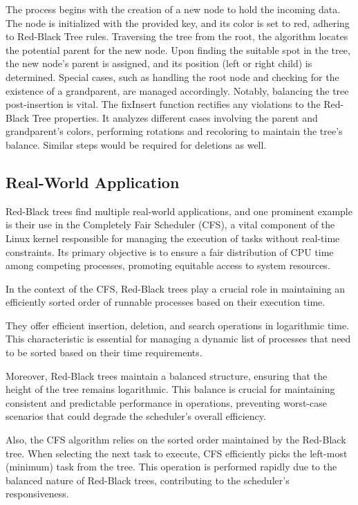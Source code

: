 \documentclass[12pt]{amsart}
\begin{document}
    The process begins with the creation of a new node to hold the incoming data. 
    The node is initialized with the provided key, and its color is set to red, 
    adhering to Red-Black Tree rules. Traversing the tree from the root, the 
    algorithm locates the potential parent for the new node. Upon finding the 
    suitable spot in the tree, the new node's parent is assigned, and its position 
    (left or right child) is determined. Special cases, such as handling the root 
    node and checking for the existence of a grandparent, are managed accordingly. 
    Notably, balancing the tree post-insertion is vital. The fixInsert function 
    rectifies any violations to the Red-Black Tree properties. It analyzes 
    different cases involving the parent and grandparent's colors, 
    performing rotations and recoloring to maintain the tree's balance.
    Similar steps would be required for deletions as well.

\subsection{Real-World Application}
   Red-Black trees find multiple real-world applications, and
   one prominent example is their use in the Completely Fair
   Scheduler (CFS), a vital component of the Linux kernel
   responsible for managing the execution of tasks without
   real-time constraints. Its primary objective is to ensure a
   fair distribution of CPU time among competing processes,
   promoting equitable access to system resources.
   
   In the context of the CFS, Red-Black trees play a crucial
   role in maintaining an efficiently sorted order of runnable
   processes based on their execution time.
   
   They offer efficient insertion, deletion, and search
   operations in logarithmic time. This characteristic is
   essential for managing a dynamic list of processes that need
   to be sorted based on their time requirements.
   
   Moreover, Red-Black trees maintain a balanced structure,
   ensuring that the height of the tree remains logarithmic.
   This balance is crucial for maintaining consistent and
   predictable performance in operations, preventing worst-case
   scenarios that could degrade the scheduler's overall
   efficiency.
   
   Also, the CFS algorithm relies on the sorted order maintained
   by the Red-Black tree. When selecting the next task to
   execute, CFS efficiently picks the left-most (minimum) task
   from the tree. This operation is performed rapidly due to the
   balanced nature of Red-Black trees, contributing to the
   scheduler's responsiveness.
   
\end{document}
